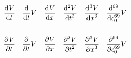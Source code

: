 \documentclass[crop=false]{standalone}
\begin{document}
\begin{align}
    \ode{V} && \ode*{V} && \ode[x]{V} && \ode{V}[2] && \ode[x]{V}[3] && \ode*[c_0]{V}[69] \\
    \nonumber \\
    \pde{t}{V} && \pde*{t}{V} && \pde{x}{V} && \pde{t}{V}[2] && \pde{x}{V}[3] && \pde*{c_0}{V}[69] 
\end{align}
\end{document}
